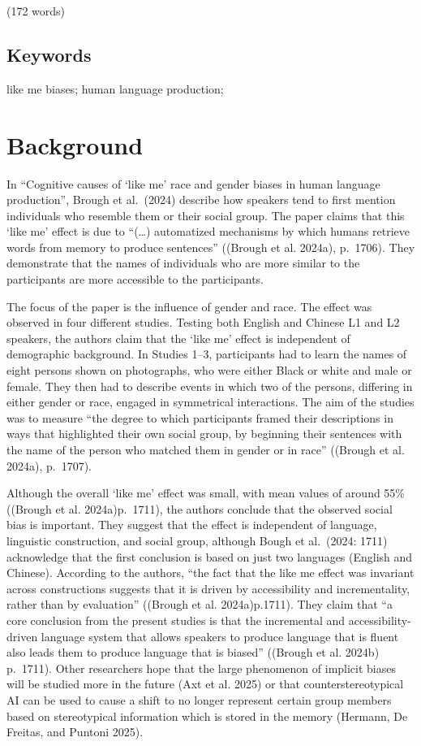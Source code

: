 \documentclass[
  letterpaper,
  DIV=11,
  numbers=noendperiod]{scrartcl}
\begin{document}
(172 words)

\subsection*{Keywords}\label{keywords}

like me biases; human language production;

\newpage{}

\section{Background}\label{background}

In ``Cognitive causes of `like me' race and gender biases in human
language production'', Brough et al.~(2024) describe how speakers tend
to first mention individuals who resemble them or their social group.
The paper claims that this `like me' effect is due to ``(\ldots)
automatized mechanisms by which humans retrieve words from memory to
produce sentences'' ((Brough et al. 2024a), p.~1706). They demonstrate
that the names of individuals who are more similar to the participants
are more accessible to the participants.

The focus of the paper is the influence of gender and race. The effect
was observed in four different studies. Testing both English and Chinese
L1 and L2 speakers, the authors claim that the `like me' effect is
independent of demographic background. In Studies 1--3, participants had
to learn the names of eight persons shown on photographs, who were
either Black or white and male or female. They then had to describe
events in which two of the persons, differing in either gender or race,
engaged in symmetrical interactions. The aim of the studies was to
measure ``the degree to which participants framed their descriptions in
ways that highlighted their own social group, by beginning their
sentences with the name of the person who matched them in gender or in
race'' ((Brough et al. 2024a), p.~1707).~

Although the overall `like me' effect was small, with mean values of
around 55\% ((Brough et al. 2024a)p.~1711), the authors conclude that
the observed social bias is important. They suggest that the effect is
independent of language, linguistic construction, and social group,
although Bough et al.~(2024: 1711) acknowledge that the first conclusion
is based on just two languages (English and Chinese). According to the
authors, ``the fact that the like me effect was invariant across
constructions suggests that it is driven by accessibility and
incrementality, rather than by evaluation'' ((Brough et al.
2024a)p.1711). They claim that ``a core conclusion from the present
studies is that the incremental and accessibility-driven language system
that allows speakers to produce language that is fluent also leads them
to produce language that is biased'' ((Brough et al. 2024b) p.~1711).
Other researchers hope that the large phenomenon of implicit biases will
be studied more in the future (Axt et al. 2025) or that
counterstereotypical AI can be used to cause a shift to no longer
represent certain group members based on stereotypical information which
is stored in the memory (Hermann, De Freitas, and Puntoni 2025).
\end{document}
